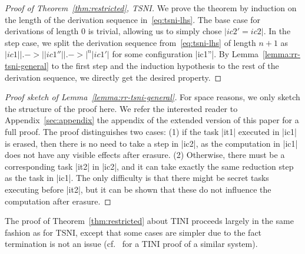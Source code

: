 \begin{proof}[Proof of Theorem~\ref{thm:restricted}, TSNI]
  We prove the theorem by induction on the length of the derivation sequence in~\eqref{eq:tsni-lhs}.
  The base case for derivations
  of length 0 is trivial, allowing
  us to simply chose $|ic2'=ic2|$.  In the step case,
  we split the derivation sequence from~\eqref{eq:tsni-lhs} of length $n+1$ as
  $|ic1| |.->| |ic1''| |.->|^n |ic1'|$
  for some configuration |ic1''|.  By Lemma~\ref{lemma:rr-tsni-general} to
  the first step and
  the induction hypothesis to the rest of the derivation sequence,
  we directly get the desired property.
\end{proof}
\begin{proof}[Proof sketch of Lemma~\ref{lemma:rr-tsni-general}]
  For space reasons, we only sketch the structure of the proof here.
  We refer the interested reader to
  \ifextended
  Appendix~\ref{sec:appendix}
  \else
  the appendix of the extended version of this paper
  \fi
  for a full proof.
  The proof distinguishes two cases: (1) if the task |it1| executed in |ic1| is erased, then there is no
    need to take a step in |ic2|, as the computation in |ic1| does
    not have any visible effects after erasure.
    (2) Otherwise, there must be a corresponding task |it2| in |ic2|, and
    it can take exactly the same reduction step as the task in |ic1|.
    The only difficulty is that there might be secret tasks executing
    before |it2|, but it can be shown that these do not influence the
    computation after erasure.
\end{proof}
The proof of Theorem~\ref{thm:restricted} about TINI proceeds largely
in the same fashion as for TSNI, except that
some cases are simpler due to the fact termination is not an issue
(cf.~\cite{lio} for a TINI proof of a similar system).
